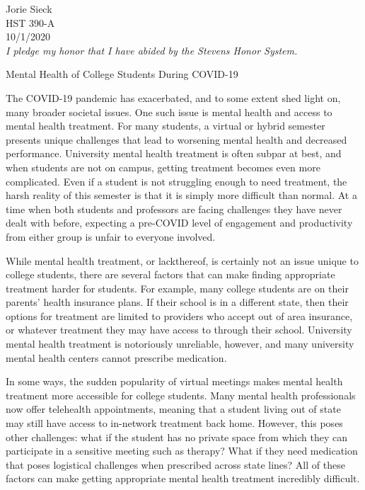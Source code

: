 \documentclass[12pt]{article}
\begin{document}
\begin{flushleft}
\noindent
Jorie Sieck \\
HST 390-A \\
10/1/2020 \\
\textit{I pledge my honor that I have abided by the Stevens Honor System.}
\begin{center} \large Mental Health of College Students During COVID-19 \end{center}
\setlength{\parindent}{.5in}

The COVID-19 pandemic has exacerbated, and to some extent shed light on, many broader societal issues. One such issue is mental health and access to mental health treatment. For many students, a virtual or hybrid semester presents unique challenges that lead to worsening mental health and decreased performance. University mental health treatment is often subpar at best, and when students are not on campus, getting treatment becomes even more complicated. Even if a student is not struggling enough to need treatment, the harsh reality of this semester is that it is simply more difficult than normal. At a time when both students and professors are facing challenges they have never dealt with before, expecting a pre-COVID level of engagement and productivity from either group is unfair to everyone involved.

While mental health treatment, or lackthereof, is certainly not an issue unique to college students, there are several factors that can make finding appropriate treatment harder for students. For example, many college students are on their parents' health insurance plans. If their school is in a different state, then their options for treatment are limited to providers who accept out of area insurance, or whatever treatment they may have access to through their school. University mental health treatment is notoriously unreliable, however, and many university mental health centers cannot prescribe medication.

In some ways, the sudden popularity of virtual meetings makes mental health treatment more accessible for college students. Many mental health professionals now offer telehealth appointments, meaning that a student living out of state may still have access to in-network treatment back home. However, this poses other challenges: what if the student has no private space from which they can participate in a sensitive meeting such as therapy? What if they need medication that poses logistical challenges when prescribed across state lines? All of these factors can make getting appropriate mental health treatment incredibly difficult.


\end{flushleft}
\end{document}
